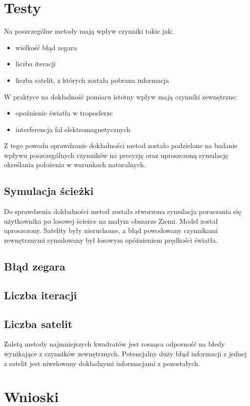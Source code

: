 \documentclass{article}
\begin{document}
\section{Testy}

Na poszczególne metody mają wpływ czynniki takie jak:
	\begin{itemize}
		\item wielkość błąd zegara
		\item liczba iteracji
		\item liczba satelit, z których została pobrana informacja
	\end{itemize}
W praktyce na dokładność pomiaru istotny wpływ mają czynniki zewnętrzne:
	\begin{itemize}
		\item opoźnienie światła w troposferze
		\item interferencja fal elektromagnetycznych
	\end{itemize}
Z tego powodu sprawdzanie dokładności metod zostało podzielone na badanie wpływu poszczególnych czynników na precyzję oraz uproszczoną symulację określania położenia w warunkach naturalnych.

\subsection{Symulacja ścieżki}

\par Do sprawdzenia dokładności metod została stworzona symulacja poruszania się użytkownika po losowej ścieżce na małym obszarze Ziemi. Model został uproszczony. Satelity były nieruchome, a błąd powodowany czynnikami zewnętrznymi symulowany był losowym opóźnieniem prędkości światła.


\subsection{Błąd zegara}



\subsection{Liczba iteracji}


\subsection{Liczba satelit}

Zaletą metody najmniejszych kwadratów jest rosnąca odporność na błedy wynikające z czynników zewnętrznych. Potencjalny duży błąd informacji z jednej z satelit jest niwelowany dokładnymi informacjami z pozostałych.

\section{Wnioski}
\end{document}
